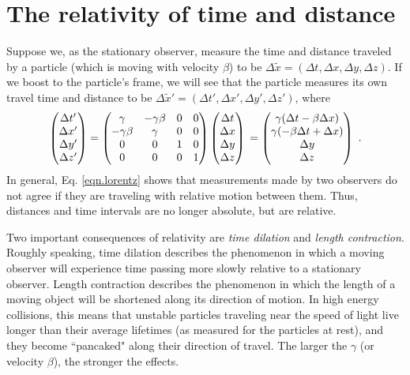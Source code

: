 \section{The relativity of time and distance}
Suppose we, as the stationary observer, measure the time and distance traveled by a particle (which is moving with velocity $\beta$) to be $\Delta\tilde x=(\Delta t, \Delta x, \Delta y, \Delta z)$. If we boost to the particle's frame, we will see that the particle measures its own travel time and distance to be $\Delta\tilde x'=(\Delta t', \Delta x', \Delta y', \Delta z')$, where
\begin{equation}
    \begin{pmatrix}
        \Delta t' \\
        \Delta x' \\
        \Delta y' \\
        \Delta z'
    \end{pmatrix}
    = \begin{pmatrix}
        \gamma & -\gamma\beta & 0 & 0 \\
        -\gamma\beta & \gamma & 0 & 0 \\
        0 & 0 & 1 & 0 \\
        0 & 0 & 0 & 1 
    \end{pmatrix}
    \begin{pmatrix}
        \Delta t \\
        \Delta x \\
        \Delta y \\
        \Delta z
    \end{pmatrix} \\
    = \begin{pmatrix}
        \gamma(\Delta t-\beta\Delta x) \\
        \gamma(-\beta \Delta t + \Delta x) \\
        \Delta y \\
        \Delta z
    \end{pmatrix} \ .
    \label{eqn.lorentz}
\end{equation}
In general, Eq. \eqref{eqn.lorentz} shows that measurements made by two observers do not agree if they are traveling with relative motion between them. Thus, distances and time intervals are no longer absolute, but are relative.

Two important consequences of relativity are {\it time dilation} and {\it length contraction}. Roughly speaking, time dilation describes the phenomenon in which a moving observer will experience time passing more slowly relative to a stationary observer. Length contraction describes the phenomenon in which the length of a moving object will be shortened along its direction of motion. In high energy collisions, this means that unstable particles traveling near the speed of light live longer than their average lifetimes (as measured for the particles at rest), and they become ``pancaked" along their direction of travel. The larger the $\gamma$ (or velocity $\beta$), the stronger the effects.

